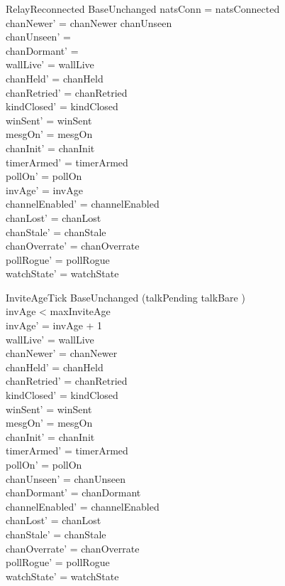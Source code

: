 \documentclass[a4paper,10pt,fleqn]{article}
\begin{document}
\begin{schema}{RelayReconnected}
  BaseUnchanged
  \where
  natsConn = natsConnected \\
  chanNewer' = chanNewer \cup chanUnseen \\
  chanUnseen' = \emptyset \\
  chanDormant' = \emptyset \\
  wallLive' = wallLive \\
  chanHeld' = chanHeld \\
  chanRetried' = chanRetried \\
  kindClosed' = kindClosed \\
  winSent' = winSent \\
  mesgOn' = mesgOn \\
  chanInit' = chanInit \\
  timerArmed' = timerArmed \\
  pollOn' = pollOn \\
  invAge' = invAge \\
  channelEnabled' = channelEnabled \\
  chanLost' = chanLost \\
  chanStale' = chanStale \\
  chanOverrate' = chanOverrate \\
  pollRogue' = pollRogue \\
  watchState' = watchState
\end{schema}

\begin{schema}{InviteAgeTick}
  BaseUnchanged
  \where
  (\dom talkPending \neq \emptyset \lor talkBare \neq \emptyset) \\
  invAge < maxInviteAge \\
  invAge' = invAge + 1 \\
  wallLive' = wallLive \\
  chanNewer' = chanNewer \\
  chanHeld' = chanHeld \\
  chanRetried' = chanRetried \\
  kindClosed' = kindClosed \\
  winSent' = winSent \\
  mesgOn' = mesgOn \\
  chanInit' = chanInit \\
  timerArmed' = timerArmed \\
  pollOn' = pollOn \\
  chanUnseen' = chanUnseen \\
  chanDormant' = chanDormant \\
  channelEnabled' = channelEnabled \\
  chanLost' = chanLost \\
  chanStale' = chanStale \\
  chanOverrate' = chanOverrate \\
  pollRogue' = pollRogue \\
  watchState' = watchState
\end{schema}
\end{document}
